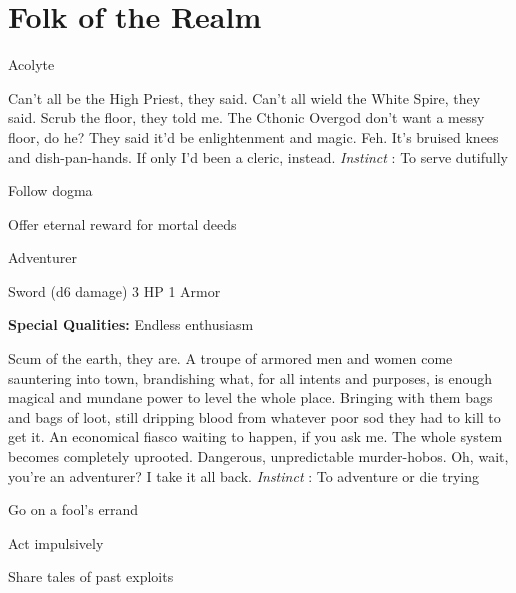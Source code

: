 \chapter{Folk of the Realm}
   
 


\startMonsterName
Acolyte	
\stopMonsterName
 
\startMonsterDescription
Can’t all be the High Priest, they said. Can’t all wield the White Spire, they said. Scrub the floor, they told me. The Cthonic Overgod don’t want a messy floor, do he? They said it’d be enlightenment and magic. Feh. It’s bruised knees and dish-pan-hands. If only I’d been a cleric, instead. {\em Instinct} : To serve dutifully
\stopMonsterDescription
 
\startitemize[1,packed]

\item Follow dogma

 
\item Offer eternal reward for mortal deeds


\stopitemize
 
\startMonsterName
Adventurer	 
\stopMonsterName
 

Sword (d6 damage)	3 HP	1 Armor

 


 
\startMonsterQualities
{\bf Special Qualities:}  Endless enthusiasm
\stopMonsterQualities
 
\startMonsterDescription
Scum of the earth, they are. A troupe of armored men and women come sauntering into town, brandishing what, for all intents and purposes, is enough magical and mundane power to level the whole place. Bringing with them bags and bags of loot, still dripping blood from whatever poor sod they had to kill to get it. An economical fiasco waiting to happen, if you ask me. The whole system becomes completely uprooted. Dangerous, unpredictable murder-hobos. Oh, wait, you’re an adventurer? I take it all back. {\em Instinct} : To adventure or die trying
\stopMonsterDescription
 
\startitemize[1,packed]

\item Go on a fool's errand

 
\item Act impulsively

 
\item Share tales of past exploits


